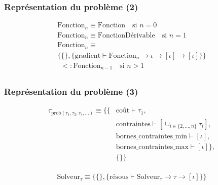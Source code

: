 \documentclass[14pt,utf8x,hyperref={pdfpagelabels=false}]{beamer}
\begin{document}
\begin{slideDecision}
  \begin{changeleftmargin}{1.1cm}
    \frametitle{Représentation du problème (2)}

    \begin{equation*}
      \begin{array}{l}
        \text{Fonction}_n \equiv \text{Fonction} \quad \text{si $n = 0$}\\
        \text{Fonction}_n \equiv \text{FonctionDérivable} \quad \text{si $n = 1$}\\
        \text{Fonction}_n \equiv \\
        \{ \{ \}, \{ \text{gradient} \vdash \text{Fonction}_n \rightarrow \iota \rightarrow [\iota] \rightarrow [\iota] \} \}\\
        ~~<: \text{Fonction}_{n-1} \quad \text{si $n > 1$}\\
      \end{array}
    \end{equation*}

  \end{changeleftmargin}
\end{slideDecision}

\begin{slideDecision}
  \begin{changeleftmargin}{1.1cm}
    \frametitle{Représentation du problème (3)}

  \begin{equation*}
  \begin{split}
    \tau_{\text{prob}(\tau_1, \tau_2, \tau_3, \dotsc)} \equiv
    \{ \{ & \text{coût} \vdash \tau_1,\\
    & \text{contraintes} \vdash [\cup_{i \in \{2, \dotsc, n\}} \tau_i],\\
    & \text{bornes\_contraintes\_min} \vdash [\iota], \\
    & \text{bornes\_contraintes\_max} \vdash [\iota] \},\\
    & \{ \} \}\\
  \end{split}
  \end{equation*}

  \begin{equation*}
    \text{Solveur}_{\tau} \equiv \{ \{ \}, \{ \text{résous} \vdash
    \text{Solveur}_{\tau} \rightarrow \tau \rightarrow [\iota] \} \}
  \end{equation*}
  \end{changeleftmargin}
\end{slideDecision}
\end{document}
